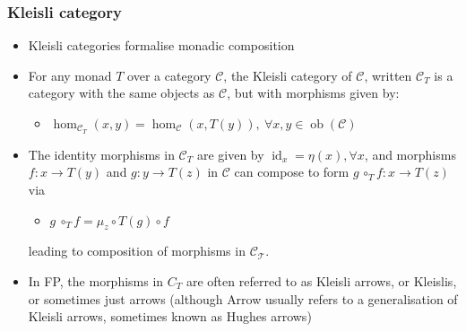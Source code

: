 \documentclass[mathserif,handout]{beamer}
\begin{document}
\begin{frame}[fragile]
  \frametitle{Kleisli category}
  \begin{itemize}
    \item Kleisli categories formalise monadic composition
  \item For any monad $T$ over a category $\mathcal{C}$, the \alert{Kleisli category} of $\mathcal{C}$, written $\mathcal{C}_T$ is a category with the same objects as $\mathcal{C}$, but with morphisms given by:
    \begin{itemize}
    \item $\operatorname{hom}_{\mathcal{C}_T}(x,y) = \operatorname{hom}_\mathcal{C}(x,T(y)),\ \forall x,y\in\operatorname{ob}(\mathcal{C})$
    \end{itemize}
  \item The identity morphisms in $\mathcal{C}_T$ are given by $\operatorname{id}_x = \eta(x), \forall x$, and morphisms $f: x\longrightarrow T(y)$ and $g: y\longrightarrow T(z)$ in $\mathcal{C}$ can compose to form $g\, \circ_T f : x\longrightarrow T(z)$ via
    \begin{itemize}
      \item $g\ \circ_T f = \mu_z \circ T(g) \circ f$
    \end{itemize}
    leading to composition of morphisms in $\mathcal{C_T}$.
    \item In FP, the morphisms in $C_T$ are often referred to as \alert{Kleisli arrows}, or \alert{Kleislis}, or sometimes just \alert{arrows} (although \alert{Arrow} usually refers to a generalisation of Kleisli arrows, sometimes known as \alert{Hughes arrows})
  \end{itemize}
\end{frame}
\end{document}
